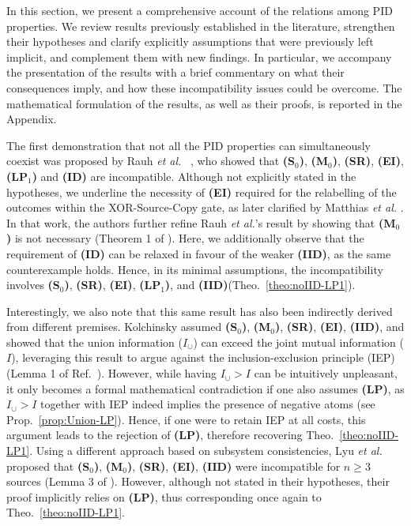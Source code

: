 \documentclass{article}
\makeatletter
\newcommand{\etal}{\textit{et al.\@} }
\newcommand{\etalx}{\textit{et al.\@}\xspace}
\newcommand{\ts}[1]{\ensuremath{_{\text{#1}}}}
\newcommand{\SR}{\textbf{(SR)}\xspace} %
\newcommand{\Sz}{\textbf{(S\ts{0})}\xspace} %
\newcommand{\Mz}{\textbf{(M\ts{0})}\xspace} %
\newcommand{\ID}{\textbf{(ID)}\xspace} %
\newcommand{\IID}{\textbf{(IID)}\xspace} %
\newcommand{\LPo}{\textbf{(LP\ts{1})}\xspace} %
\newcommand{\EI}{\textbf{(EI)}\xspace} %
\newcommand{\LP}{\textbf{(LP)}\xspace}
\makeatother
\begin{document}
In this section, we present a comprehensive account of the relations among PID properties. We review results previously established in the literature, strengthen their hypotheses and clarify explicitly assumptions that were previously left implicit, and complement them with new findings. In particular, we accompany the presentation of the results with a brief commentary on what their consequences imply, and how these incompatibility issues could be overcome.
The mathematical formulation of the results, as well as their proofs, is reported in the Appendix. 


The first demonstration that not all the PID properties can simultaneously coexist was proposed by Rauh \etal~\cite{rauh2014reconsidering}, who showed that \Sz, \Mz, \SR, \EI, \LPo and \ID are incompatible. Although not explicitly stated in the hypotheses, we underline the necessity of \EI required for the relabelling of the outcomes within the XOR-Source-Copy gate, as later clarified by Matthias \etal \cite{matthias2025novel}. In that work, the authors further refine Rauh \etalx's result by showing that \Mz is not necessary (Theorem 1 of \cite{matthias2025novel}). Here, we additionally observe that the requirement of \ID can be relaxed in favour of the weaker \IID, as the same counterexample holds. Hence, in its minimal assumptions, the incompatibility involves \Sz, \SR, \EI, \LPo, and \IID (Theo.~\ref{theo:noIID-LP1}). 

Interestingly, we also note that this same result has also been indirectly derived from different premises. Kolchinsky assumed \Sz, \Mz, \SR, \EI, \IID, and showed that the union information ($I_\cup$) can exceed the joint mutual information ($I$), leveraging this result to argue against the inclusion-exclusion principle (IEP) (Lemma 1 of Ref.~\cite{kolchinsky2022novel}). However, while having $I_\cup>I$ can be intuitively unpleasant, it only becomes a formal mathematical contradiction if one also assumes \LP, as $I_\cup>I$ together with IEP indeed implies the presence of negative atoms (see Prop.~\ref{prop:Union-LP}). Hence, if one were to retain IEP at all costs, this argument leads to the rejection of \LP, therefore recovering Theo.~\ref{theo:noIID-LP1}.
Using a different approach based on subsystem consistencies, Lyu \etal proposed that \Sz, \Mz, \SR, \EI, \IID were incompatible for $n\ge3$ sources (Lemma 3 of \cite{lyu2024explicit}). However, although not stated in their hypotheses, their proof implicitly relies on \LP, thus corresponding once again to Theo.~\ref{theo:noIID-LP1}.
\end{document}
